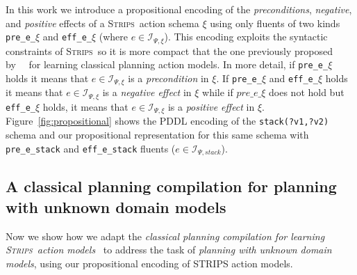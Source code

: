 \documentclass{article}
\newcommand{\strips}{\textsc{Strips}}
\begin{document}
In this work we introduce a propositional encoding of the {\em preconditions}, {\em negative}, and {\em positive} effects of a \strips\ action schema $\xi$ using only fluents of two kinds {\tt\small pre\_e\_$\xi$} and {\tt\small eff\_e\_$\xi$} (where $e\in{\mathcal I}_{\Psi,\xi}$). This encoding exploits the syntactic constraints of \strips\, so it is more compact that the one previously proposed by~\citeauthor{aineto2018learning}~\citeyear{aineto2018learning} for learning classical planning action models. In more detail, if {\tt\small pre\_e\_$\xi$} holds it means that $e\in{\mathcal I}_{\Psi,\xi}$ is a {\em precondition} in $\xi$. If {\tt\small pre\_e\_$\xi$} and {\tt\small eff\_e\_$\xi$} holds it means that $e\in{\mathcal I}_{\Psi,\xi}$ is a {\em negative effect} in $\xi$ while if $pre\_e\_\xi$ does not hold but {\tt\small eff\_e\_$\xi$} holds, it means that $e\in{\mathcal I}_{\Psi,\xi}$ is a {\em positive effect} in $\xi$. Figure~\ref{fig:propositional} shows the PDDL encoding of the {\tt\small stack(?v1,?v2)} schema and our propositional representation for this same schema with {\tt\small pre\_e\_stack} and {\tt\small eff\_e\_stack} fluents ($e\in{\mathcal I}_{\Psi,stack}$).

\subsection{A classical planning compilation for planning with unknown domain models}
Now we show how we adapt the {\em classical planning compilation for learning \strips\ action models}~\cite{aineto2018learning} to address the task of {\em planning with unknown domain models}, using our propositional encoding of STRIPS action models.
\end{document}
